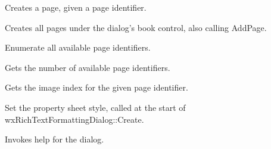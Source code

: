 Creates a page, given a page identifier.

\label{wxrichtextformattingdialogfactorycreatepages}


Creates all pages under the dialog's book control, also calling AddPage.

\label{wxrichtextformattingdialogfactorygetpageid}


Enumerate all available page identifiers.

\label{wxrichtextformattingdialogfactorygetpageidcount}


Gets the number of available page identifiers.

\label{wxrichtextformattingdialogfactorygetpageimage}


Gets the image index for the given page identifier.

\label{wxrichtextformattingdialogfactorysetsheetstyle}


Set the property sheet style, called at the start of wxRichTextFormattingDialog::Create.

\label{wxrichtextformattingdialogfactoryshowhelp}


Invokes help for the dialog.

